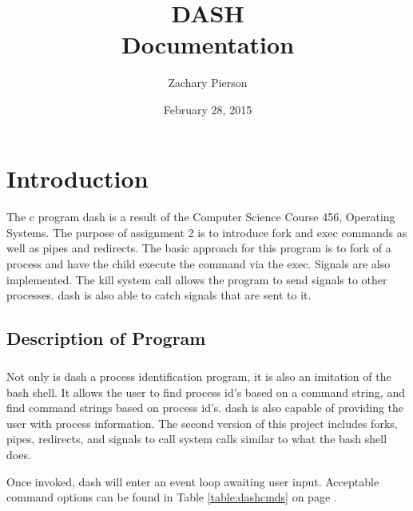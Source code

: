 \documentclass[10pt]{article}
\title{\textbf{DASH} \\Documentation}
\date{February 28, 2015}
\author{Zachary Pierson}
\begin{document}
\maketitle

\newpage
\tableofcontents
\newpage

\section{Introduction}
\paragraph{}
The c program dash is a result of the Computer Science Course 456, Operating Systems. The purpose of assignment 2 is to introduce fork and exec commands as well as pipes and redirects.  The basic approach for this program is to fork of a process and have the child execute the command via the exec. Signals are also implemented. The kill system call allows the program to send signals to other processes. dash is also able to catch signals that are sent to it.


\subsection{Description of Program}
\subparagraph{}
Not only is dash a process identification program, it is also an imitation of the bash shell. It allows the user to find process id's based on a command string, and find command strings based on process id's. dash is also capable of providing the user with process information. The second version of this project includes forks, pipes, redirects, and signals to call system calls similar to what the bash shell does.

Once invoked, dash will enter an event loop awaiting user input. Acceptable command options can be found in Table \ref{table:dashcmds} on page \pageref{table:dashcmds}.
\end{document}
